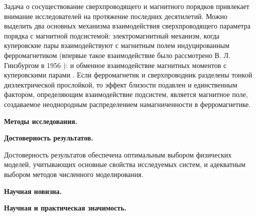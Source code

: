 Задача о сосуществование сверхпроводящего и магнитного порядков привлекает 
внимание исследователей на протяжение последних десятилетий. Можно выделить 
два основных механизма взаимодействия сверхпроводящего параметра порядка с 
магнитной подсистемой: электромагнитный механизм, когда куперовские пары 
взаимодействуют с магнитным полем индуцированным ферромагнетиком (впервые 
такое взаимодействие было рассмотрено В. Л. Гинзбургом в 1956 
\cite{ginzburg}): и обменное взаимодействие магнитных моментов с куперовскими 
парами \cite{buzdin,bulaev}. Если ферромагнетик и сверхпроводник разделены 
тонкой диэлектрической прослойкой, то эффект близости подавлен и единственным 
фактором, определяющим взаимодействие подсистем, является магнитное поле, 
создаваемое неоднородным распределением намагниченности в ферромагнетике.

\textbf{Методы исследования.}

\textbf{Достоверность результатов.}

Достоверность результатов обеспечена оптимальным выбором физических моделей, 
учитывающих основные свойства исследуемых систем, и адекватным выбором 
методов численного моделирования.

\textbf{Научная новизна.}

\textbf{Научная и практическая значимость.}

\newpage